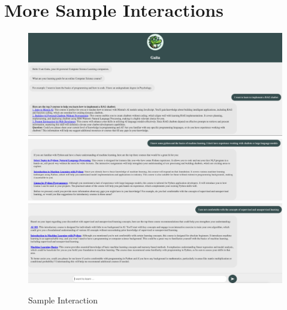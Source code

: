 \appendix 
\makeatletter
{}
\makeatother
\renewcommand{\thechapter}{\Alph{chapter}}

\chapter{More Sample Interactions} \label{chap:appendix-a}

\begin{figure}
    \includegraphics[width=1\linewidth]{figures/ex2a.png}
    \includegraphics[width=1\linewidth]{figures/ex2b.png}
    \includegraphics[width=1\linewidth]{figures/ex2c.png}
    \caption{Sample Interaction}
    \label{fig:hu}
\end{figure}
